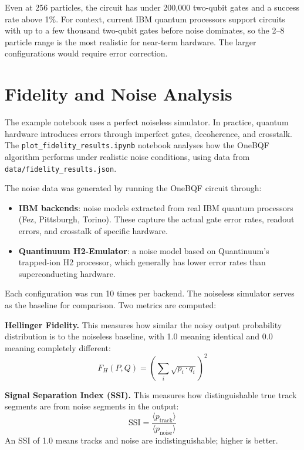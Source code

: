 \documentclass[11pt, a4paper]{article}
\begin{document}
Even at 256 particles, the circuit has under 200{,}000 two-qubit gates
and a success rate above 1\%. For context, current IBM quantum processors
support circuits with up to a few thousand two-qubit gates before noise
dominates, so the 2--8 particle range is the most realistic for
near-term hardware. The larger configurations would require error
correction.

\section{Fidelity and Noise Analysis}

The example notebook uses a perfect noiseless simulator. In practice,
quantum hardware introduces errors through imperfect gates, decoherence,
and crosstalk. The \texttt{plot\_fidelity\_results.ipynb} notebook
analyses how the OneBQF algorithm performs under realistic noise
conditions, using data from \texttt{data/fidelity\_results.json}.

The noise data was generated by running the OneBQF circuit through:
\begin{itemize}
    \item \textbf{IBM backends}: noise models extracted from real IBM
          quantum processors (Fez, Pittsburgh, Torino). These capture the
          actual gate error rates, readout errors, and crosstalk of
          specific hardware.
    \item \textbf{Quantinuum H2-Emulator}: a noise model based on
          Quantinuum's trapped-ion H2 processor, which generally has
          lower error rates than superconducting hardware.
\end{itemize}

Each configuration was run 10 times per backend. The noiseless simulator
serves as the baseline for comparison. Two metrics are computed:

\textbf{Hellinger Fidelity.} This measures how similar the noisy output
probability distribution is to the noiseless baseline, with 1.0 meaning
identical and 0.0 meaning completely different:
\begin{equation}
    F_H(P, Q) = \left(\sum_i \sqrt{p_i \cdot q_i}\right)^2
\end{equation}

\textbf{Signal Separation Index (SSI).} This measures how distinguishable
true track segments are from noise segments in the output:
\begin{equation}
    \text{SSI} = \frac{\langle p_{\text{track}} \rangle}{\langle p_{\text{noise}} \rangle}
\end{equation}
An SSI of 1.0 means tracks and noise are indistinguishable; higher is
better.
\end{document}
